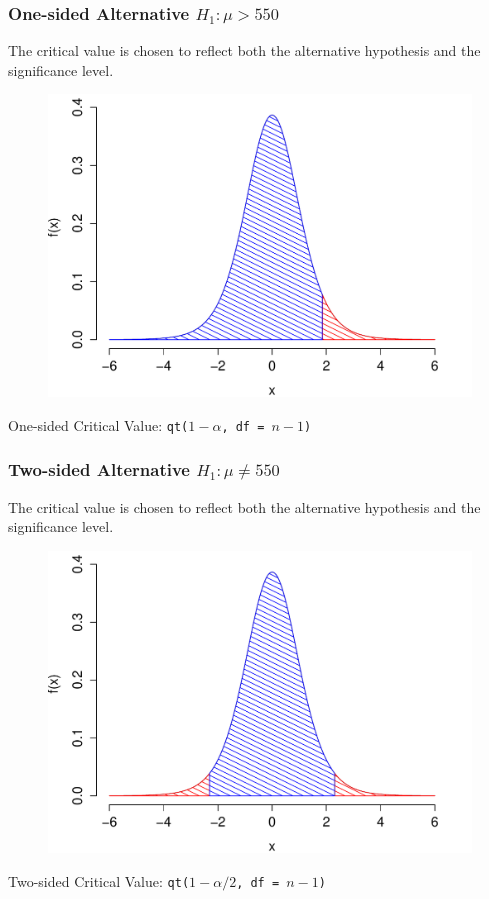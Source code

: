\documentclass[handout]{beamer}
\begin{document}
\begin{frame}
\frametitle{One-sided Alternative $H_1\colon \mu > 550$}
The critical value is chosen to reflect both the alternative hypothesis and the significance level. 
\begin{figure}
\includegraphics[scale = 0.45]{./images/one_side}
\end{figure}
One-sided Critical Value: \texttt{qt($1-\alpha$, df  = $n-1$)}
\end{frame}



\begin{frame}
\frametitle{Two-sided Alternative $H_1\colon \mu \neq 550$}
The critical value is chosen to reflect both the alternative hypothesis and the significance level. 
\begin{figure}
\includegraphics[scale = 0.45]{./images/two_side}
\end{figure}
Two-sided Critical Value: \texttt{qt($1-\alpha/2$, df  = $n-1$)}
\end{frame}
\end{document}
